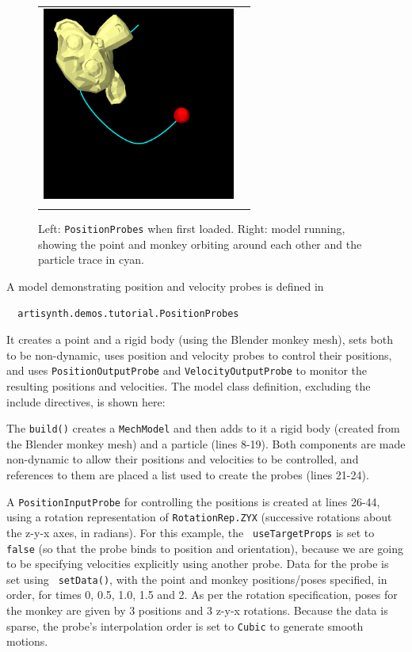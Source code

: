 \begin{figure}[ht]
\begin{center}
\begin{tabular}{cc}
  \includegraphics[height=2.5in]{images/PositionProbes1}\\
\fi
\end{tabular}
\end{center}
\caption{Left: {\tt PositionProbes} when first loaded. Right: model running,
showing the point and monkey orbiting around each other and the particle
trace in cyan.}
\label{PositionProbes:fig}
\end{figure}

A model demonstrating position and velocity probes is defined in
%
\begin{verbatim}
  artisynth.demos.tutorial.PositionProbes
\end{verbatim}
%
It creates a point and a rigid body (using the Blender monkey mesh), sets both
to be non-dynamic, uses position and velocity probes to control their
positions, and uses {\tt PositionOutputProbe} and {\tt VelocityOutputProbe} to
monitor the resulting positions and velocities. The model class definition,
excluding the include directives, is shown here:
%
\lstset{numbers=left}
\iflatexml

\else

\fi
\lstset{numbers=none}
%
The {\tt build()} creates a {\tt MechModel} and then adds to it a rigid body
(created from the Blender monkey mesh) and a particle (lines 8-19).  Both
components are made non-dynamic to allow their positions and velocities to be
controlled, and references to them are placed a list used to create the probes
(lines 21-24).

A {\tt PositionInputProbe} for controlling the positions is created at lines
26-44, using a rotation representation of {\tt RotationRep.ZYX} (successive
rotations about the z-y-x axes, in radians). For this example, the {\tt
useTargetProps} is set to {\tt false} (so that the probe binds to {\sf
position} and {\sf orientation}), because we are going to be specifying
velocities explicitly using another probe. Data for the probe is set using {\tt
setData()}, with the point and monkey positions/poses specified, in order, for
times 0, 0.5, 1.0, 1.5 and 2. As per the rotation specification, poses for the
monkey are given by 3 positions and 3 z-y-x rotations. Because the data is
sparse, the probe's interpolation order is set to {\tt Cubic} to generate
smooth motions.

